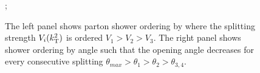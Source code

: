 \begin{figure}[h!]
\begin{resizedtikzpicture}{0.56\linewidth}
\begin{feynman}
		;
	\end{feynman}
\end{resizedtikzpicture}
\caption[The left panel shows parton shower ordering by \ktsq{} where the splitting strength $V_{i}(\ktsq)$ is ordered $V_1 > V_2 > V_3$. The right panel shows shower ordering by angle such that the opening angle decreases for every consecutive splitting $\theta_{max} > \theta_{1} > \theta_{2} > \theta_{3, 4}$.]{The left panel shows parton shower ordering by \ktsq{} where the splitting strength $V_{i}(\ktsq)$ is ordered $V_1 > V_2 > V_3$. The right panel shows shower ordering by angle such that the opening angle decreases for every consecutive splitting $\theta_{max} > \theta_{1} > \theta_{2} > \theta_{3, 4}$.}
\label{fig:feyn-ordering}
\end{figure}
